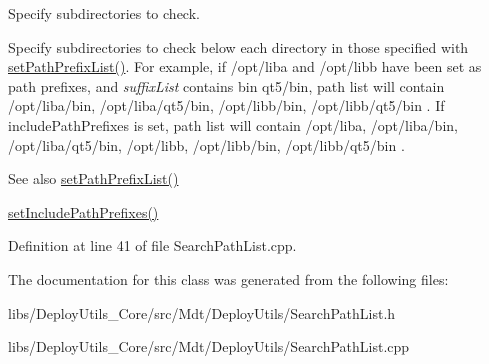 Specify subdirectories to check. 

Specify subdirectories to check below each directory in those specified with \hyperlink{class_mdt_1_1_deploy_utils_1_1_search_path_list_ab850ca5b09572c85f38d9a2b0d56608b}{set\+Path\+Prefix\+List()}. For example, if /opt/liba and /opt/libb have been set as path prefixes, and {\itshape suffix\+List} contains bin qt5/bin, path list will contain /opt/liba/bin, /opt/liba/qt5/bin, /opt/libb/bin, /opt/libb/qt5/bin . If include\+Path\+Prefixes is set, path list will contain /opt/liba, /opt/liba/bin, /opt/liba/qt5/bin, /opt/libb, /opt/libb/bin, /opt/libb/qt5/bin .

\begin{DoxySeeAlso}{See also}
\hyperlink{class_mdt_1_1_deploy_utils_1_1_search_path_list_ab850ca5b09572c85f38d9a2b0d56608b}{set\+Path\+Prefix\+List()} 

\hyperlink{class_mdt_1_1_deploy_utils_1_1_search_path_list_a3f10eadc3981b72ac9d2efc54484fa9a}{set\+Include\+Path\+Prefixes()} 
\end{DoxySeeAlso}


Definition at line 41 of file Search\+Path\+List.\+cpp.



The documentation for this class was generated from the following files\+:\begin{DoxyCompactItemize}
\item 
libs/\+Deploy\+Utils\+\_\+\+Core/src/\+Mdt/\+Deploy\+Utils/Search\+Path\+List.\+h\item 
libs/\+Deploy\+Utils\+\_\+\+Core/src/\+Mdt/\+Deploy\+Utils/Search\+Path\+List.\+cpp\end{DoxyCompactItemize}

